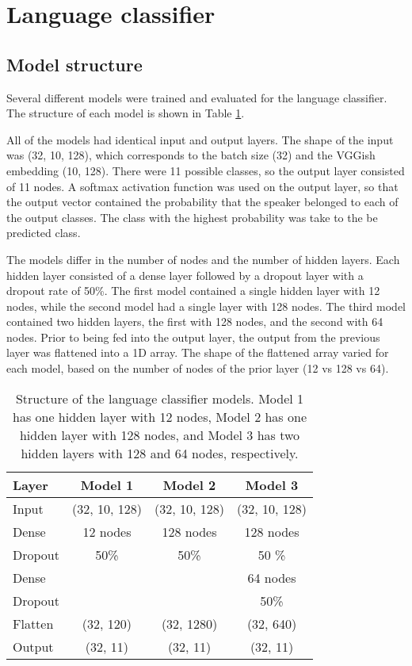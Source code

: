 \documentclass[11pt, letterpaper]{article}
\begin{document}
\section{Language classifier}
\subsection{Model structure}

Several different models were trained and evaluated for the language classifier. The structure of each model is shown in Table \ref{tab:LangModels}. 

All of the models had identical input and output layers. The shape of the input was (32, 10, 128), which corresponds to the batch size (32) and the VGGish embedding (10, 128).  There were 11 possible classes, so the output layer consisted of 11 nodes. A softmax activation function was used on the output layer, so that the output vector contained the probability that the speaker belonged to each of the output classes. The class with the highest probability was take to the be predicted class.

The models differ in the number of nodes and the number of hidden layers. Each hidden layer consisted of a dense layer followed by a dropout layer with a dropout rate of 50\%. The first model contained a single hidden layer with 12 nodes, while the second model had a single layer with 128 nodes. The third model contained two hidden layers, the first with 128 nodes, and the second with 64 nodes. Prior to being fed into the output layer, the output from the previous layer was flattened into a 1D array. The shape of the flattened array varied for each model, based on the number of nodes of the prior layer (12 vs 128 vs 64).

\begin{table}[!h]
\begin{center}
\caption{Structure of the language classifier models. Model 1 has one hidden layer with 12 nodes, Model 2 has one hidden layer with 128 nodes, and Model 3 has two hidden layers with 128 and 64 nodes, respectively.}
\begin{tabular}{l | c |c  | c |}

Layer  & Model 1 & Model 2 & Model 3\\
\hline

Input 	& (32, 10, 128)& (32, 10, 128) & (32, 10, 128) \\ \hline

Dense	& 12 nodes 	& 128 nodes 	& 128 nodes \\
Dropout	& 50\%		& 50\%		& 50 \% \\ \hline

Dense	&			&			& 64 nodes \\
Dropout	&			& 			& 50\% \\ \hline

Flatten 	& (32, 120)	& (32, 1280)	& (32, 640) \\ \hline
Output 	& (32, 11)		& (32, 11)		& (32, 11)\\
\hline
\end{tabular}

\label{tab:LangModels}
\end{center}
\end{table}
\end{document}
